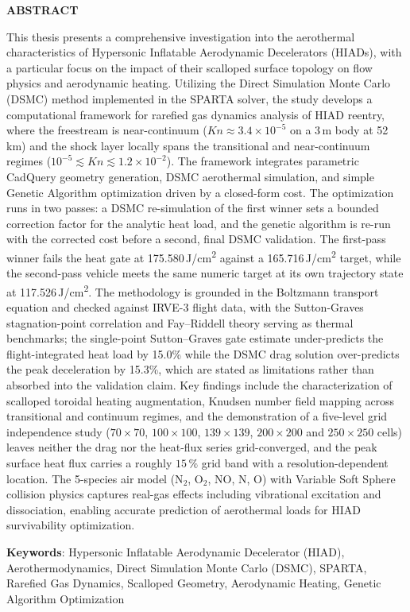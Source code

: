 \clearpage
{}
{}
\begin{center}
\textbf{\large  ABSTRACT}\\[0.5cm]
\end{center}

This thesis presents a comprehensive investigation into the aerothermal characteristics of Hypersonic Inflatable Aerodynamic Decelerators (HIADs), with a particular focus on the impact of their scalloped surface topology on flow physics and aerodynamic heating. Utilizing the Direct Simulation Monte Carlo (DSMC) method implemented in the SPARTA solver, the study develops a computational framework for rarefied gas dynamics analysis of HIAD reentry, where the freestream is near-continuum ($Kn \approx 3.4\times10^{-5}$ on a 3\,m body at 52\,km) and the shock layer locally spans the transitional and near-continuum regimes ($10^{-5} \lesssim Kn \lesssim 1.2\times10^{-2}$). The framework integrates parametric CadQuery geometry generation, DSMC aerothermal simulation, and simple Genetic Algorithm optimization driven by a closed-form cost. The optimization runs in two passes: a DSMC re-simulation of the first winner sets a bounded correction factor for the analytic heat load, and the genetic algorithm is re-run with the corrected cost before a second, final DSMC validation. The first-pass winner fails the heat gate at 175.580\,J/cm\textsuperscript{2} against a 165.716\,J/cm\textsuperscript{2} target, while the second-pass vehicle meets the same numeric target at its own trajectory state at 117.526\,J/cm\textsuperscript{2}. The methodology is grounded in the Boltzmann transport equation and checked against IRVE-3 flight data, with the Sutton-Graves stagnation-point correlation and Fay--Riddell theory serving as thermal benchmarks; the single-point Sutton--Graves gate estimate under-predicts the flight-integrated heat load by 15.0\% while the DSMC drag solution over-predicts the peak deceleration by 15.3\%, which are stated as limitations rather than absorbed into the validation claim. Key findings include the characterization of scalloped toroidal heating augmentation, Knudsen number field mapping across transitional and continuum regimes, and the demonstration of a five-level grid independence study ($70\times70$, $100\times100$, $139\times139$, $200\times200$ and $250\times250$ cells) leaves neither the drag nor the heat-flux series grid-converged, and the peak surface heat flux carries a roughly $15\,\%$ grid band with a resolution-dependent location. The 5-species air model (N$_2$, O$_2$, NO, N, O) with Variable Soft Sphere collision physics captures real-gas effects including vibrational excitation and dissociation, enabling accurate prediction of aerothermal loads for HIAD survivability optimization.

\noindent \textbf{Keywords}: Hypersonic Inflatable Aerodynamic Decelerator (HIAD), Aerothermodynamics, Direct Simulation Monte Carlo (DSMC), SPARTA, Rarefied Gas Dynamics, Scalloped Geometry, Aerodynamic Heating, Genetic Algorithm Optimization